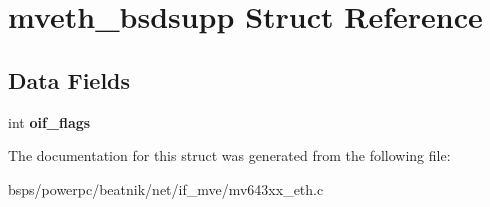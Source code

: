 \hypertarget{structmveth__bsdsupp}{}\section{mveth\+\_\+bsdsupp Struct Reference}
\label{structmveth__bsdsupp}
\subsection*{Data Fields}
\begin{DoxyCompactItemize}
\item 
\mbox{\label{structmveth__bsdsupp_a141dc446b1a7fdaa27949aaed9f69b29}} 
int {\bfseries oif\+\_\+flags}
\end{DoxyCompactItemize}


The documentation for this struct was generated from the following file\+:\begin{DoxyCompactItemize}
\item 
bsps/powerpc/beatnik/net/if\+\_\+mve/mv643xx\+\_\+eth.\+c\end{DoxyCompactItemize}
